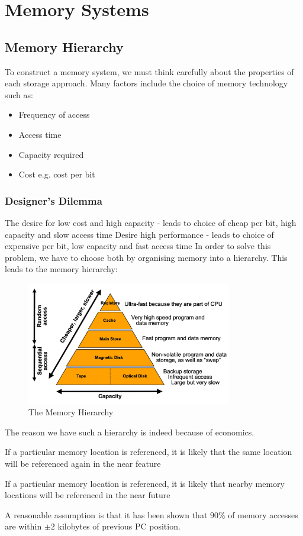 \documentclass[a4paper]{article}
\theoremstyle{plain}
\theoremstyle{definition}
\newtheorem{defn}{Definition}[section]
\theoremstyle{remark}
\begin{document}
\section{Memory Systems}
\subsection{Memory Hierarchy}
To construct a memory system, we must think carefully about the properties of each storage approach. Many factors include the choice of memory technology such as:
\begin{itemize}
	\item Frequency of access
	\item Access time
	\item Capacity required
	\item Cost e.g. cost per bit
\end{itemize}
\subsubsection{Designer's Dilemma}
The desire for low cost and high capacity - leads to choice of cheap per bit, high capacity and slow access time
Desire high performance - leads to choice of expensive per bit, low capacity and fast access time
In order to solve this problem, we have to choose both by organising memory into a hierarchy.
This leads to the memory hierarchy:
\begin{figure}[H]
	\centering
	\includegraphics[width=0.8\textwidth]{figures/hierarchy.png}
	\caption{The Memory Hierarchy}
	\label{fig:Hierarchy}
\end{figure}
The reason we have such a hierarchy is indeed because of economics. 
\begin{tcolorbox}[colback=black!3!white,colframe=black!60!white,title=\begin{defn}Temporal Locality \label{Temporal Locality}\end{defn}]
If a particular memory location is referenced, it is likely that the same location will be referenced again in the near feature
\end{tcolorbox}
\begin{tcolorbox}[colback=black!3!white,colframe=black!60!white,title=\begin{defn}Spatial Locality \label{Spatial Locality}\end{defn}]
If a particular memory location is referenced, it is likely that nearby memory locations will be referenced in the near future
\end{tcolorbox}
A reasonable assumption is that it has been shown that $90 \%$ of memory accesses are within $\pm 2$ kilobytes of previous PC position.
\end{document}
